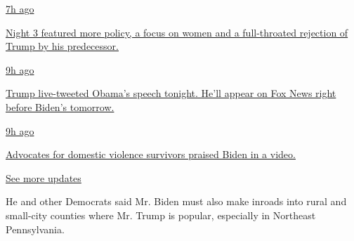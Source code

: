 \href{https://www.nytimes3xbfgragh.onion/live/2020/08/19/us/dnc-convention-election?action=click\&pgtype=Article\&state=default\&region=MAIN_CONTENT_1\&context=storylines_live_updates\#night-3-featured-more-policy-a-focus-on-women-and-a-full-throated-rejection-of-trump-by-his-predecessor}{7h
ago}

\href{https://www.nytimes3xbfgragh.onion/live/2020/08/19/us/dnc-convention-election?action=click\&pgtype=Article\&state=default\&region=MAIN_CONTENT_1\&context=storylines_live_updates\#night-3-featured-more-policy-a-focus-on-women-and-a-full-throated-rejection-of-trump-by-his-predecessor}{Night
3 featured more policy, a focus on women and a full-throated rejection
of Trump by his predecessor.}

\href{https://www.nytimes3xbfgragh.onion/live/2020/08/19/us/dnc-convention-election?action=click\&pgtype=Article\&state=default\&region=MAIN_CONTENT_1\&context=storylines_live_updates\#trump-live-tweeted-obamas-speech-tonight-hell-appear-on-fox-news-right-before-bidens-tomorrow}{9h
ago}

\href{https://www.nytimes3xbfgragh.onion/live/2020/08/19/us/dnc-convention-election?action=click\&pgtype=Article\&state=default\&region=MAIN_CONTENT_1\&context=storylines_live_updates\#trump-live-tweeted-obamas-speech-tonight-hell-appear-on-fox-news-right-before-bidens-tomorrow}{Trump
live-tweeted Obama's speech tonight. He'll appear on Fox News right
before Biden's tomorrow.}

\href{https://www.nytimes3xbfgragh.onion/live/2020/08/19/us/dnc-convention-election?action=click\&pgtype=Article\&state=default\&region=MAIN_CONTENT_1\&context=storylines_live_updates\#advocates-for-domestic-violence-survivors-praised-biden-in-a-video}{9h
ago}

\href{https://www.nytimes3xbfgragh.onion/live/2020/08/19/us/dnc-convention-election?action=click\&pgtype=Article\&state=default\&region=MAIN_CONTENT_1\&context=storylines_live_updates\#advocates-for-domestic-violence-survivors-praised-biden-in-a-video}{Advocates
for domestic violence survivors praised Biden in a video.}

\href{https://www.nytimes3xbfgragh.onion/live/2020/08/19/us/dnc-convention-election?action=click\&pgtype=Article\&state=default\&region=MAIN_CONTENT_1\&context=storylines_live_updates}{See
more updates}

He and other Democrats said Mr. Biden must also make inroads into rural
and small-city counties where Mr. Trump is popular, especially in
Northeast Pennsylvania.

